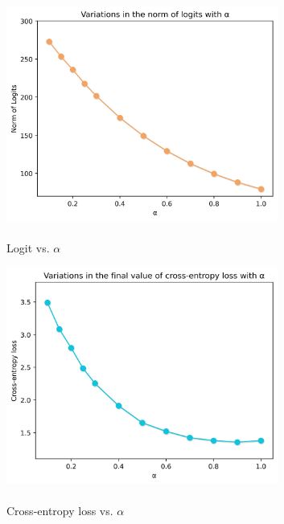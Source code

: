\documentclass[runningheads]{llncs}
\begin{document}
\begin{figure}[!t]
\centering
\begin{subfigure}{0.33\textwidth}
\centering
\includegraphics[width=0.98\textwidth]{logit_vs_alpha}
\caption{\\Logit vs. $\alpha$}
\end{subfigure}%
\begin{subfigure}{0.33\textwidth}
\centering
\includegraphics[width=0.98\textwidth]{loss_vs_alpha}
\caption{\\Cross-entropy loss vs. $\alpha$}
\end{subfigure}%
\begin{subfigure}{0.33\textwidth}

\end{subfigure}
\end{figure}
\end{document}
